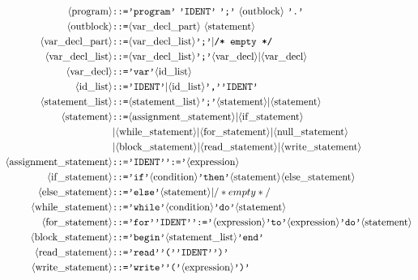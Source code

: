 \documentclass[dvipdfmx,a4j]{jbook}
\begin{document}
\begin{align*}
\bnfnts{program} & \bnfarr \bnfts{program}\ \bnfts{IDENT}\ \bnfts{;}\ \bnfnts{outblock}\ \bnfts{.}\\
\bnfnts{outblock} & \texttt{::=} 
\bnfnts{var\_decl\_part}\ \bnfnts{statement}\\
\bnfnts{var\_decl\_part} & \texttt{::=} \bnfnts{var\_decl\_list} \bnfts{;} \vert \texttt{/* empty */}\\
\bnfnts{var\_decl\_list} & \bnfarr \bnfnts{var\_decl\_list} \bnfts{;} \bnfnts{var\_decl} \vert \bnfnts{var\_decl}\\
\bnfnts{var\_decl} & \bnfarr \bnfts{var} \bnfnts{id\_list}\\
\bnfnts{id\_list} & \bnfarr \bnfts{IDENT} \vert \bnfnts{id\_list} \bnfts{,} \bnfts{IDENT}\\
\bnfnts{statement\_list} & \bnfarr \bnfnts{statement\_list} \bnfts{;} \bnfnts{statement} \vert \bnfnts{statement}\\
\bnfnts{statement} & \bnfarr \bnfnts{assignment\_statement}
             \vert \bnfnts{if\_statement}\\
            & \vert \bnfnts{while\_statement}
             \vert \bnfnts{for\_statement}
             \vert \bnfnts{null\_statement}\\
            & \vert \bnfnts{block\_statement}
             \vert \bnfnts{read\_statement}
             \vert \bnfnts{write\_statement}\\
\bnfnts{assignment\_statement} & \bnfarr \bnfts{IDENT} \bnfts{:=} \bnfnts{expression}\\
\bnfnts{if\_statement} & \bnfarr \bnfts{if} \bnfnts{condition} \bnfts{then} \bnfnts{statement} \bnfnts{else\_statement}\\
\bnfnts{else\_statement} & \bnfarr \bnfts{else} \bnfnts{statement} \vert /* empty */\\
\bnfnts{while\_statement} & \bnfarr \bnfts{while} \bnfnts{condition} \bnfts{do} \bnfnts{statement}\\
\bnfnts{for\_statement} & \bnfarr \bnfts{for} \bnfts{IDENT} \bnfts{:=} \bnfnts{expression} \bnfts{to} \bnfnts{expression} \bnfts{do} \bnfnts{statement}\\
\bnfnts{block\_statement} & \bnfarr \bnfts{begin} \bnfnts{statement\_list} \bnfts{end}\\
\bnfnts{read\_statement} & \bnfarr \bnfts{read} \bnfts{(} \bnfts{IDENT} \bnfts{)}\\
\bnfnts{write\_statement} & \bnfarr \bnfts{write} \bnfts{(} \bnfnts{expression} \bnfts{)}\\

\end{align*}
\end{document}
